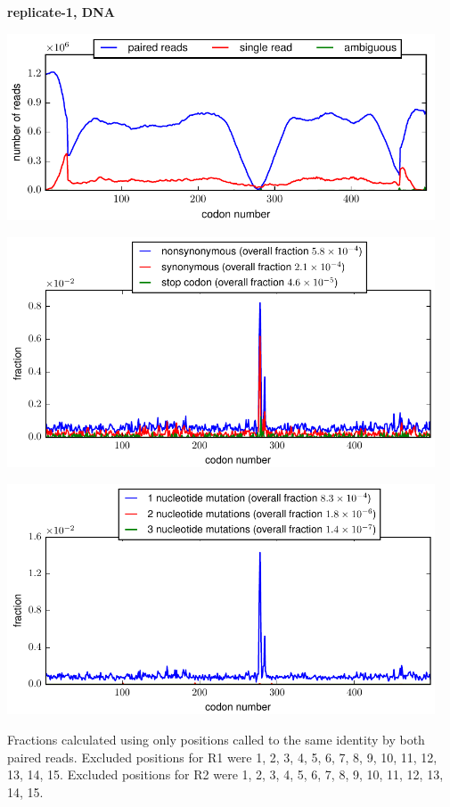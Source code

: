 \documentclass[10pt,letterpaper]{article}
\begin{document}
\centerline{\Large \bf replicate-1, DNA}
\vspace{0.1in}

\centerline{\includegraphics[width=5in]{replicate-1-DNA_codondepth.pdf}}
\vspace{0.1in}

\centerline{\includegraphics[width=5in]{replicate-1-DNA_syn-ns-dist.pdf}}
\vspace{0.1in}

\centerline{\includegraphics[width=5in]{replicate-1-DNA_nmutspercodon-dist.pdf}}
\vspace{0.1in}

Fractions calculated using only positions called to the same identity by both paired reads.  Excluded positions for R1 were 1, 2, 3, 4, 5, 6, 7, 8, 9, 10, 11, 12, 13, 14, 15. 
 Excluded positions for R2 were 1, 2, 3, 4, 5, 6, 7, 8, 9, 10, 11, 12, 13, 14, 15. 
\end{document}
